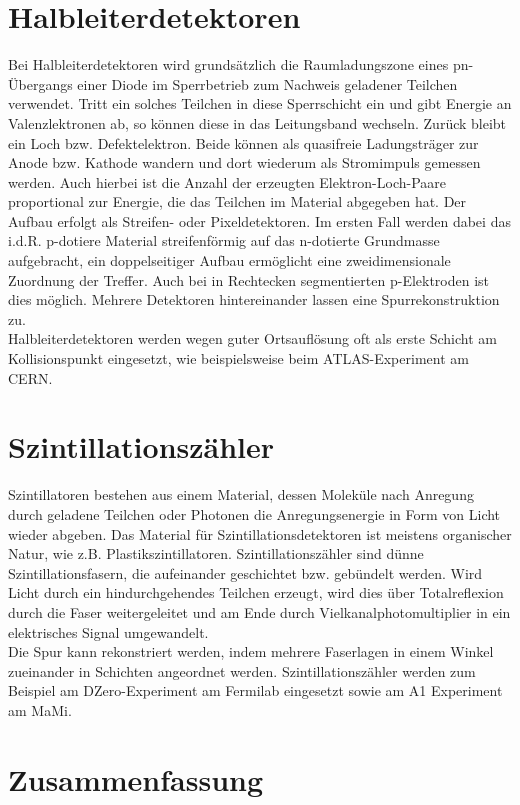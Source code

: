 \documentclass{PoS}
\begin{document}
\section{Halbleiterdetektoren}

Bei Halbleiterdetektoren wird grundsätzlich die Raumladungszone eines pn-Übergangs einer Diode im
Sperrbetrieb zum Nachweis geladener Teilchen verwendet. Tritt ein solches Teilchen in diese
Sperrschicht ein und gibt Energie an Valenzlektronen ab, so können diese in das Leitungsband
wechseln. Zurück bleibt ein Loch bzw. Defektelektron. Beide können als quasifreie Ladungsträger zur
Anode bzw. Kathode wandern und dort wiederum als Stromimpuls gemessen werden. Auch hierbei ist die
Anzahl der erzeugten Elektron-Loch-Paare proportional zur Energie, die das Teilchen im Material
abgegeben hat.
Der Aufbau erfolgt als Streifen- oder Pixeldetektoren. Im ersten Fall werden dabei das i.d.R. 
p-dotiere Material streifenförmig auf das n-dotierte Grundmasse aufgebracht, ein doppelseitiger
Aufbau ermöglicht eine zweidimensionale Zuordnung der Treffer. Auch bei in Rechtecken segmentierten
p-Elektroden ist dies möglich. Mehrere Detektoren hintereinander lassen eine Spurrekonstruktion
zu.\\
Halbleiterdetektoren werden wegen guter Ortsauflösung oft als erste Schicht am Kollisionspunkt
eingesetzt, wie beispielsweise beim ATLAS-Experiment am CERN.

\section{Szintillationszähler}

Szintillatoren bestehen aus einem Material, dessen Moleküle nach Anregung durch geladene Teilchen
oder Photonen die Anregungsenergie in Form von Licht wieder abgeben. Das Material für
Szintillationsdetektoren ist meistens organischer Natur, wie z.B. Plastikszintillatoren.
Szintillationszähler sind dünne Szintillationsfasern, die aufeinander geschichtet bzw. gebündelt
werden. Wird Licht durch ein hindurchgehendes Teilchen erzeugt, wird dies über Totalreflexion durch 
die Faser weitergeleitet und am Ende durch Vielkanalphotomultiplier in ein elektrisches Signal
umgewandelt.
\\
Die Spur kann rekonstriert werden, indem mehrere Faserlagen in einem Winkel zueinander in Schichten
angeordnet werden. Szintillationszähler werden zum Beispiel am DZero-Experiment am Fermilab
eingesetzt sowie am A1 Experiment am MaMi.

\section{Zusammenfassung}
\end{document}
